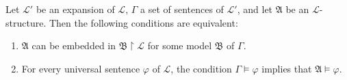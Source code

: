 Let $\mathcal{L}'$ be an expansion of $\mathcal{L}$, $\Gamma$ a set of sentences of $\mathcal{L}'$, and let $\mathfrak{A}$ be an $\mathcal{L}$-structure. Then the following conditions are equivalent:
\begin{enumerate}
\item[(1)] $\mathfrak{A}$ can be embedded in $\mathfrak{B} \upharpoonright \mathcal{L}$ for some model $\mathfrak{B}$ of $\Gamma$.
\item[(2)] For every universal sentence $\varphi$ of $\mathcal{L}$, the condition $\Gamma \models \varphi$ implies that $\mathfrak{A} \models \varphi$.
\end{enumerate}
